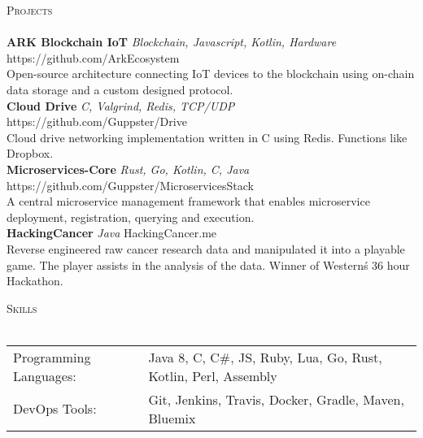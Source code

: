 \documentclass[a4paper]{article}
\newcommand{\lineunder} {
    \vspace*{-8pt} \\
    \hspace*{-18pt} \hrulefill \\
}
\newcommand{\header} [1] {
    {\hspace*{-18pt}\vspace*{6pt} \textsc{#1}}
    \vspace*{-6pt} \lineunder
}
\begin{document}
\header{Projects}
{\textbf{ARK Blockchain IoT} \sl Blockchain, Javascript, Kotlin, Hardware} \hfill https://github.com/ArkEcosystem\\
\vspace*{1mm}
Open-source architecture connecting IoT devices to the blockchain using on-chain data storage and a custom designed protocol.\\
\vspace*{2mm}
{\textbf{Cloud Drive} \sl C, Valgrind, Redis, TCP/UDP} \hfill https://github.com/Guppster/Drive\\
\vspace*{1mm}
Cloud drive networking implementation written in C using Redis. Functions like Dropbox.\\
\vspace*{2mm}
{\textbf{Microservices-Core} \sl Rust, Go, Kotlin, C, Java} \hfill https://github.com/Guppster/MicroservicesStack\\
\vspace*{1mm}
A central microservice management framework that enables microservice deployment, registration, querying and execution.\\
\vspace*{2mm}
{\textbf{HackingCancer} \sl Java} \hfill HackingCancer.me\\
\vspace*{1mm}
Reverse engineered raw cancer research data and manipulated it into a playable game. The player assists in the analysis of the data. Winner of Western\'s 36 hour Hackathon.\\

\vspace*{2mm}

\header{Skills}
\begin{tabular}{ l l }
	Programming Languages: & Java 8, C, C\#, JS, Ruby, Lua, Go, Rust, Kotlin, Perl, Assembly \\
	DevOps Tools:          & Git, Jenkins, Travis, Docker, Gradle, Maven, Bluemix \\
\end{tabular}

\vspace*{2mm}

\vspace*{2mm}

\ 
\end{document}
